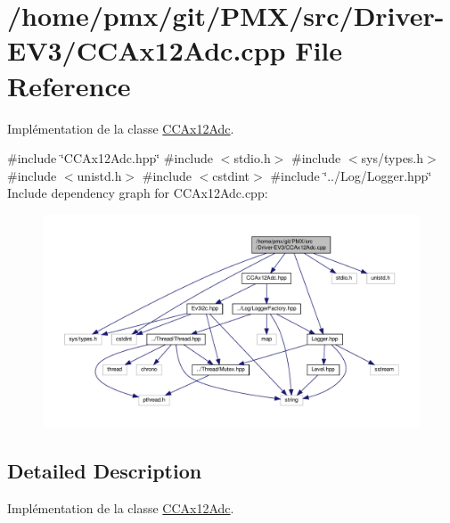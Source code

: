 \hypertarget{Driver-EV3_2CCAx12Adc_8cpp}{}\section{/home/pmx/git/\+P\+M\+X/src/\+Driver-\/\+E\+V3/\+C\+C\+Ax12\+Adc.cpp File Reference}
\label{Driver-EV3_2CCAx12Adc_8cpp}


Implémentation de la classe \hyperlink{classCCAx12Adc}{C\+C\+Ax12\+Adc}.  


{\ttfamily \#include \char`\"{}C\+C\+Ax12\+Adc.\+hpp\char`\"{}}\newline
{\ttfamily \#include $<$stdio.\+h$>$}\newline
{\ttfamily \#include $<$sys/types.\+h$>$}\newline
{\ttfamily \#include $<$unistd.\+h$>$}\newline
{\ttfamily \#include $<$cstdint$>$}\newline
{\ttfamily \#include \char`\"{}../\+Log/\+Logger.\+hpp\char`\"{}}\newline
Include dependency graph for C\+C\+Ax12\+Adc.\+cpp\+:
\nopagebreak
\begin{figure}[H]
\begin{center}
\leavevmode
\includegraphics[width=350pt]{Driver-EV3_2CCAx12Adc_8cpp__incl}
\end{center}
\end{figure}


\subsection{Detailed Description}
Implémentation de la classe \hyperlink{classCCAx12Adc}{C\+C\+Ax12\+Adc}. 

